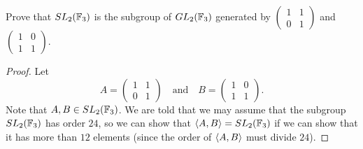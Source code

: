  Prove that $SL_2(\mathbb{F}_3)$ is the subgroup of $GL_2(\mathbb{F}_3)$
generated by $\begin{pmatrix} 1 & 1 \\ 0 & 1 \end{pmatrix}$ and
$\begin{pmatrix} 1 & 0 \\ 1 & 1 \end{pmatrix}$.
\label{exercise:subgroup-SL2-F3}
\begin{proof}
  Let
  \begin{equation*}
    A =
    \begin{pmatrix}
      1 & 1 \\
      0 & 1
    \end{pmatrix}
    \quad\text{and}\quad
    B =
    \begin{pmatrix}
      1 & 0 \\
      1 & 1
    \end{pmatrix}.
  \end{equation*}
  Note that $A,B\in SL_2(\mathbb{F}_3)$. We are told that we may assume that
  the subgroup $SL_2(\mathbb{F}_3)$ has order $24$, so we can show that
  $\langle{A,B}\rangle = SL_2(\mathbb{F}_3)$ if we can show that it has more than $12$
  elements (since the order of $\langle{A,B}\rangle$ must divide $24$).


\end{proof}
